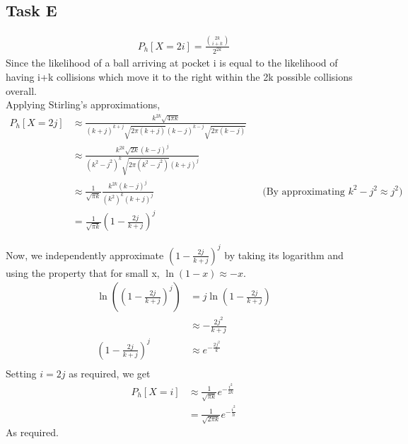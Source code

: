 \subsection{Task E}
\begin{align*}
    P_h[X=2i]=\frac{{{2k}\choose{i+k}}}{2^{2k}}
\end{align*}
Since the likelihood of a ball arriving at pocket i is equal to the likelihood of having i+k collisions which move it to the right within the 2k possible collisions overall.\\
Applying Stirling's approximations,
\begin{align*}
    P_h[X=2j] &\approx \frac{k^{2k}\sqrt{4\pi k}}{(k+j)^{k+j}\sqrt{2\pi (k+j)}(k-j)^{k-j}\sqrt{2\pi (k-j)}}\\
    &\approx \frac{k^{2k}\sqrt{2k}(k-j)^j}{(k^2-j^2)^{k}\sqrt{2\pi (k^2-j^2)}(k+j)^j}\\
    &\approx \frac{1}{\sqrt{\pi k}}\frac{k^{2k}(k-j)^{j}}{(k^2)^k(k+j)^{j}} && \text{(By approximating $k^2 - j^2 \approx j^2$)}\\
    &= \frac{1}{\sqrt{\pi k}}\left(1-\frac{2j}{k+j}\right)^j
\end{align*}

Now, we independently approximate $\left(1-\frac{2j}{k+j}\right)^j$ by taking its logarithm and using the property that for small x, $\ln(1-x) \approx -x$.
\begin{align*}
    \ln\left(\left(1-\frac{2j}{k+j}\right)^j\right) &= j\ln\left(1-\frac{2j}{k+j}\right)\\
    &\approx -\frac{2j^2}{k+j}\\
    \left(1-\frac{2j}{k+j}\right)^j&\approx e^{-\frac{2j^2}{k}}\\
\end{align*}
Setting $i=2j$ as required, we get 
\begin{align*}
    P_h[X=i]&\approx \frac{1}{\sqrt{\pi k}}e^{-\frac{i^2}{2k}}\\
    &= \frac{1}{\sqrt{2\pi k}}e^{-\frac{i^2}{h}}
\end{align*}
As required.